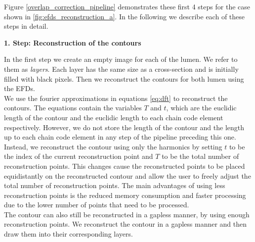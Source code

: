 \documentclass[thesis.tex]{subfiles}
\begin{document}
Figure \ref{overlap_correction_pipeline} demonstrates these first 4 steps for the case shown in \ref{fig:efds_reconstruction_a}.  
In the following we describe each of these steps in detail. 

\textbf{1. Step: Reconstruction of the contours}

In the first step we create an empty image for each of the lumen. We refer to them as \textit{layers}. Each layer has the same size as a cross-section and is initially filled with black pixels. Then we reconstruct the contours for both lumen using the EFDs. \\
We use the fourier approximations in equations \ref{eq:dft} to reconstruct the contours. The equations contain the variables $T$ and $t$, which are the euclidic length of the contour and the euclidic length to each chain code element respectively. However, we do not store the length of the contour and the length up to each chain code element in any step of the pipeline preceding this one. Instead, we reconstruct the contour using only the harmonics by setting $t$ to be the index of the current reconstruction point and $T$ to be the total number of reconstruction points. This changes cause the reconstructed points to be placed equidistantly on the reconstructed contour and allow the user to freely adjust the total number of reconstruction points. The main advantages of using less reconstruction points is the reduced memory consumption and faster processing due to the lower number of points that need to be processed. \\ 
The contour can also still be reconstructed in a gapless manner, by using enough reconstruction points. We reconstruct the contour in a gapless manner and then draw them into their corresponding layers. %

\end{document}
